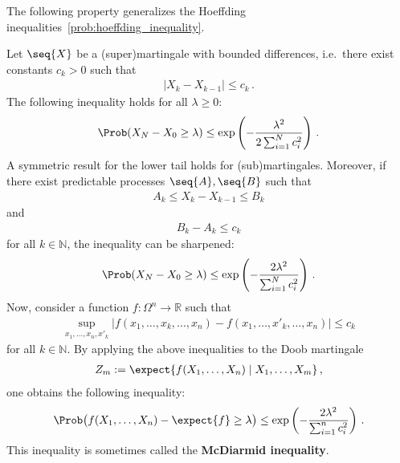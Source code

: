     The following property generalizes the Hoeffding inequalities~\cref{prob:hoeffding_inequality}.
    \begin{property}\label{prob:hoeffding_azuma}
        Let $\seq{X}$ be a (super)martingale with bounded differences, i.e.~there exist constants $c_k>0$ such that
        \begin{gather}
            |X_k-X_{k-1}|\leq c_k\,.
        \end{gather}
        The following inequality holds for all $\lambda\geq0$:
        \begin{gather}
            \Prob(X_N-X_0\geq\lambda)\leq\exp\left(-\frac{\lambda^2}{2\sum_{i=1}^Nc_i^2}\right)\,.
        \end{gather}
        A symmetric result for the lower tail holds for (sub)martingales. Moreover, if there exist predictable processes $\seq{A},\seq{B}$ such that
        \begin{gather}
            A_k\leq X_k-X_{k-1}\leq B_k
        \end{gather}
        and
        \begin{gather}
            B_k-A_k\leq c_k
        \end{gather}
        for all $k\in\mathbb{N}$, the inequality can be sharpened:
        \begin{gather}
            \Prob(X_N-X_0\geq\lambda)\leq\exp\left(-\frac{2\lambda^2}{\sum_{i=1}^Nc_i^2}\right)\,.
        \end{gather}
        Now, consider a function $f:\Omega^n\rightarrow\mathbb{R}$ such that
        \begin{gather}
            \sup_{x_1,\ldots,x_n,x'_k}|f(x_1,\ldots,x_k,\ldots,x_n)-f(x_1,\ldots,x'_k,\ldots,x_n)|\leq c_k
        \end{gather}
        for all $k\in\mathbb{N}$. By applying the above inequalities to the Doob martingale
        \begin{gather}
            Z_m:=\expect{f(X_1,\ldots,X_n)\mid X_1,\ldots,X_m}\,,
        \end{gather}
        one obtains the following inequality:
        \begin{gather}
            \Prob\bigl(f(X_1,\ldots,X_n)-\expect{f}\geq\lambda\bigr)\leq\exp\left(-\frac{2\lambda^2}{\sum_{i=1}^nc_i^2}\right)\,.
        \end{gather}
        This inequality is sometimes called the \textbf{McDiarmid inequality}.
    \end{property}

